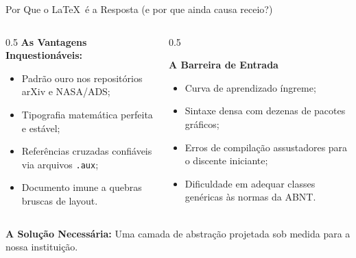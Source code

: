 \documentclass[aspectratio=169, 10pt]{beamer}
\begin{document}
\begin{frame}{Por Que o \LaTeX\ é a Resposta (e por que ainda causa receio?)}
  \begin{columns}[c]
    \begin{column}{0.5\textwidth}
      \textbf{As Vantagens Inquestionáveis:}
      \begin{itemize}
        \item Padrão ouro nos repositórios arXiv e NASA/ADS;
        \item Tipografia matemática perfeita e estável;
        \item Referências cruzadas confiáveis via arquivos \texttt{.aux};
        \item Documento imune a quebras bruscas de layout.
      \end{itemize}
    \end{column}

    \begin{column}{0.5\textwidth}
      \begin{alertblock}{\textbf{A Barreira de Entrada}}
        \begin{itemize}
          \item Curva de aprendizado íngreme;
          \item Sintaxe densa com dezenas de pacotes gráficos;
          \item Erros de compilação assustadores para o discente iniciante;
          \item Dificuldade em adequar classes genéricas às normas da ABNT.
        \end{itemize}
      \end{alertblock}
    \end{column}
  \end{columns}
  \vspace{0.4cm}
  \centering \textbf{A Solução Necessária:} Uma camada de abstração projetada sob medida para a nossa instituição.
\end{frame}
\end{document}
